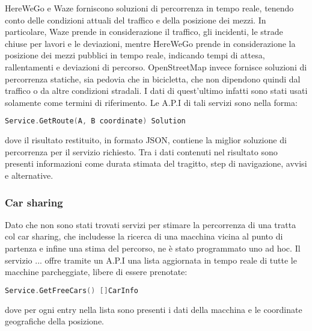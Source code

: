 HereWeGo e Waze forniscono soluzioni di percorrenza in tempo reale, tenendo conto delle condizioni attuali del traffico e della posizione dei mezzi. In particolare, Waze prende in considerazione il traffico, gli incidenti, le strade chiuse per lavori e le deviazioni, mentre HereWeGo prende in considerazione la posizione dei mezzi pubblici in tempo reale, indicando tempi di attesa, rallentamenti e deviazioni di percorso. OpenStreetMap invece fornisce soluzioni di percorrenza statiche, sia pedovia che in bicicletta, che non dipendono quindi dal traffico o da altre condizioni stradali. I dati di quest'ultimo infatti sono stati usati solamente come termini di riferimento. Le A.P.I di tali servizi sono nella forma:
\begin{lstlisting}[language=Go]
Service.GetRoute(A, B coordinate) Solution
\end{lstlisting}
dove il risultato restituito, in formato JSON, contiene la miglior soluzione di percorrenza per il servizio richiesto. Tra i dati contenuti nel risultato sono presenti informazioni come durata stimata del tragitto, step di navigazione, avvisi e alternative.

\subsubsection{Car sharing}

Dato che non sono stati trovati servizi per stimare la percorrenza di una tratta col car sharing, che includesse la ricerca di una macchina vicina al punto di partenza e infine una stima del percorso, ne è stato programmato uno ad hoc. Il servizio ... offre tramite un A.P.I una lista aggiornata in tempo reale di tutte le macchine parcheggiate, libere di essere prenotate:
\begin{lstlisting}[language=Go]
Service.GetFreeCars() []CarInfo
\end{lstlisting}
dove per ogni entry nella lista sono presenti i dati della macchina e le coordinate geografiche della posizione.

